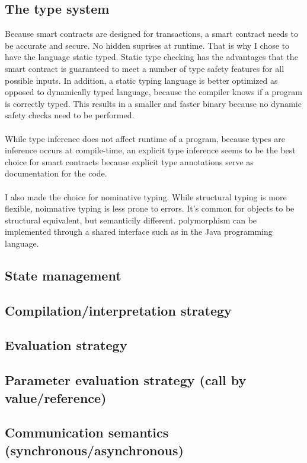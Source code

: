 \documentclass{uva-inf-article}
\begin{document}
\subsection{The type system}
Because smart contracts are designed for transactions, a smart contract needs to be accurate and secure. No hidden suprises at runtime.
That is why I chose to have the language static typed.
Static type checking has the advantages that the smart contract is guaranteed to meet a number of type safety features for all possible inputs.
In addition, a static typing language is better optimized as opposed to dynamically typed language, because the compiler knows if a program is correctly typed.
This results in a smaller and faster binary because no dynamic safety checks need to be performed.
\\\\
While type inference does not affect runtime of a program, because types are inference occurs at compile-time,
an explicit type inference seems to be the best choice for smart contracts because  
explicit type annotations serve as documentation for the code.
\\\\
I also made the choice for nominative typing. 
While structural typing is more flexible, noimnative typing is less prone to errors.
It's common for objects to be structural equivalent, but semanticily different.
polymorphism can be implemented through a shared interface such as in the Java programming language.

\subsection{State management}
\subsection{Compilation/interpretation strategy}
\subsection{Evaluation strategy}

\subsection{Parameter evaluation strategy (call by value/reference)}
\subsection{Communication semantics (synchronous/asynchronous)}
\end{document}
